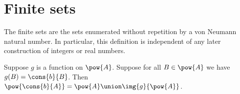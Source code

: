 \section{Finite sets}






The finite sets are the sets enumerated without repetition by a von Neumann
natural number.  In particular, this definition is independent of any later
construction of integers or real numbers.

\begin{proposition}\label{powerset_cons_image}
    Suppose $g$ is a function on $\pow{A}$.
    Suppose for all $B\in\pow{A}$ we have $g(B)=\cons{b}{B}$.
    Then $\pow{\cons{b}{A}}=\pow{A}\union\img{g}{\pow{A}}$.
\end{proposition}
